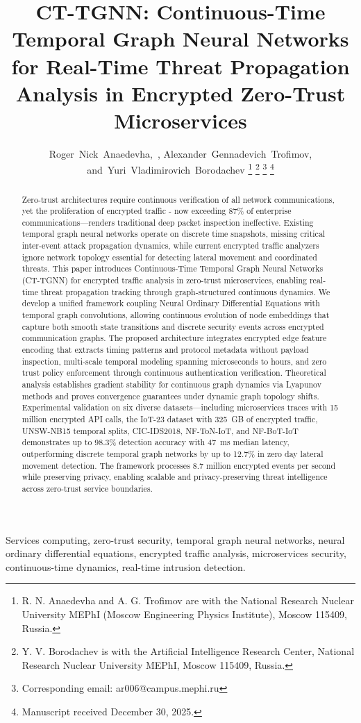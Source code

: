 \documentclass[lettersize,journal]{IEEEtran}
\title{CT-TGNN: Continuous-Time Temporal Graph Neural Networks for Real-Time Threat Propagation Analysis in Encrypted Zero-Trust Microservices}
\author{Roger~Nick~Anaedevha,~\IEEEmembership{Member,~IEEE},
        Alexander~Gennadevich~Trofimov,
        and~Yuri~Vladimirovich~Borodachev%
\thanks{R. N. Anaedevha and A. G. Trofimov are with the National Research Nuclear University MEPhI (Moscow Engineering Physics Institute), Moscow 115409, Russia.}%
\thanks{Y. V. Borodachev is with the Artificial Intelligence Research Center, National Research Nuclear University MEPhI, Moscow 115409, Russia.}%
\thanks{Corresponding email: ar006@campus.mephi.ru}%
\thanks{Manuscript received December 30, 2025.}}
\begin{document}
\maketitle

\begin{abstract}
Zero-trust architectures require continuous verification of all network communications, yet the proliferation of encrypted traffic - now exceeding 87\% of enterprise communications—renders traditional deep packet inspection ineffective. Existing temporal graph neural networks operate on discrete time snapshots, missing critical inter-event attack propagation dynamics, while current encrypted traffic analyzers ignore network topology essential for detecting lateral movement and coordinated threats. This paper introduces Continuous-Time Temporal Graph Neural Networks (CT-TGNN) for encrypted traffic analysis in zero-trust microservices, enabling real-time threat propagation tracking through graph-structured continuous dynamics. We develop a unified framework coupling Neural Ordinary Differential Equations with temporal graph convolutions, allowing continuous evolution of node embeddings that capture both smooth state transitions and discrete security events across encrypted communication graphs. The proposed architecture integrates encrypted edge feature encoding that extracts timing patterns and protocol metadata without payload inspection, multi-scale temporal modeling spanning microseconds to hours, and zero trust policy enforcement through continuous authentication verification. Theoretical analysis establishes gradient stability for continuous graph dynamics via Lyapunov methods and proves convergence guarantees under dynamic graph topology shifts. Experimental validation on six diverse datasets—including microservices traces with 15 million encrypted API calls, the IoT-23 dataset with 325~GB of encrypted traffic, UNSW-NB15 temporal splits, CIC-IDS2018, NF-ToN-IoT, and NF-BoT-IoT demonstrates up to 98.3\% detection accuracy with 47~ms median latency, outperforming discrete temporal graph networks by up to 12.7\% in zero day lateral movement detection. The framework processes 8.7 million encrypted events per second while preserving privacy, enabling scalable and privacy-preserving threat intelligence across zero-trust service boundaries.
\end{abstract}

\begin{IEEEkeywords}
Services computing, zero-trust security, temporal graph neural networks, neural ordinary differential equations, encrypted traffic analysis, microservices security, continuous-time dynamics, real-time intrusion detection.
\end{IEEEkeywords}
\end{document}
